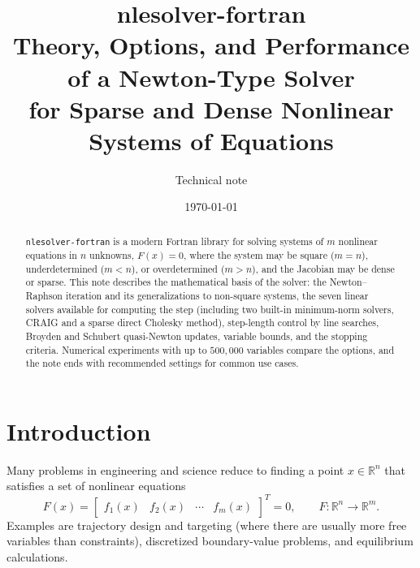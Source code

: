 \documentclass[11pt]{article}
\title{\textbf{nlesolver-fortran}\\[0.3em]\large Theory, Options, and Performance of a Newton-Type Solver\\for Sparse and Dense Nonlinear Systems of Equations}
\author{Technical note}
\date{\today}
\newcommand{\R}{\mathbb{R}}
\newcommand{\code}[1]{\texttt{#1}}
\begin{document}
\maketitle

\begin{abstract}
\noindent
\code{nlesolver-fortran} is a modern Fortran library for solving systems of $m$ nonlinear
equations in $n$ unknowns, $F(x) = 0$, where the system may be square ($m=n$),
underdetermined ($m<n$), or overdetermined ($m>n$), and the Jacobian may be dense or sparse.
This note describes the mathematical basis of the solver: the Newton--Raphson iteration and its
generalizations to non-square systems, the seven linear solvers available for computing the step
(including two built-in minimum-norm solvers, CRAIG and a sparse direct Cholesky method),
step-length control by line searches, Broyden and Schubert quasi-Newton updates, variable bounds,
and the stopping criteria. Numerical experiments with up to $500{,}000$ variables compare the
options, and the note ends with recommended settings for common use cases.
\end{abstract}

\tableofcontents
\newpage

\section{Introduction}

Many problems in engineering and science reduce to finding a point $x \in \R^n$ that satisfies
a set of nonlinear equations
\begin{equation}
  F(x) = \begin{bmatrix} f_1(x) & f_2(x) & \cdots & f_m(x) \end{bmatrix}^T = 0,
  \qquad F : \R^n \to \R^m .
  \label{eq:problem}
\end{equation}
Examples are trajectory design and targeting (where there are usually more free variables than
constraints), discretized boundary-value problems, and equilibrium calculations.
\end{document}
